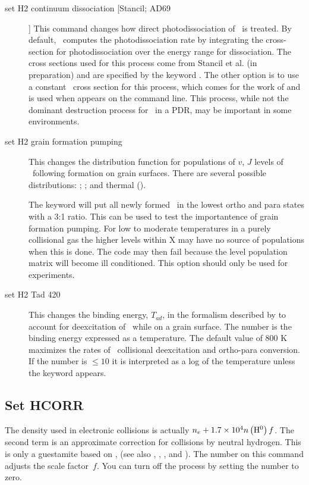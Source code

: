 \begin{description}
\item[set H2 continuum dissociation [Stancil; AD69]]  
This command changes how direct photodissociation
of \htwo\ is treated.  
By default, \Cloudy\ computes the photodissociation rate 
by integrating the cross-section
for photodissociation over the energy range for dissociation.  
The cross sections used for this process come from 
Stancil et al. (in preparation) and are specified by the 
keyword .  
The other option 
is to use a constant \htwo\ cross section for this process, 
which comes for the work of \citet{Allison1969} and 
is used when  appears on the command line.  
This process, while not the dominant destruction
process for \htwo\ in a PDR, may be important in some environments.

\item[set H2 grain formation pumping]  This changes
the distribution function
for populations of $v$, $J$ levels of \htwo\ following formation on grain surfaces.
There are several possible
distributions: \citet[, this is the default]{Takahashi2001};
\citet[]{Draine1996}; and thermal ().

The keyword  will put all newly formed \htwo\ in the lowest ortho and
para states with a 3:1 ratio.
This can be used to test the importantence of grain formation pumping.
For low to moderate temperatures in a purely collisional gas
the higher levels within X may have no 
source of populations when this is done.
The code may then fail because the level population matrix will become ill conditioned.
This option should only be used for experiments.

\item[set H2 Tad 420]  This changes the binding energy,
$T_{ad}$, in the formalism
described by \citet{LeBourlot2000} to account for deexcitation
of \htwo\ while on
a grain surface.
The number is the binding energy expressed as a
temperature.
The default value of 800 K maximizes the rates of \htwo\ collisional deexcitation and ortho-para conversion.
If the number is
$\le 10$ it is interpreted as a log of the temperature
unless the keyword  appears.
\end{description}

\subsection{Set HCORR}

The density used in electronic collisions is actually $n_e  + 1.7 \times
10^{4} n\left( {\mbox{{\rm H}$^0$} } \right)f$.
The second term is an approximate correction for collisions by neutral
hydrogen.
This is only a guestamite based on \citet{Drawin1969},
(see also \citealp{Weisheit1974},
\citealp{Steenbock1984}, \citealp{Lambert1993}, and \citealp{Kiselman2000}).
The
number on this command adjusts the scale factor~$f$.
You can turn off the
process by setting the number to zero.

